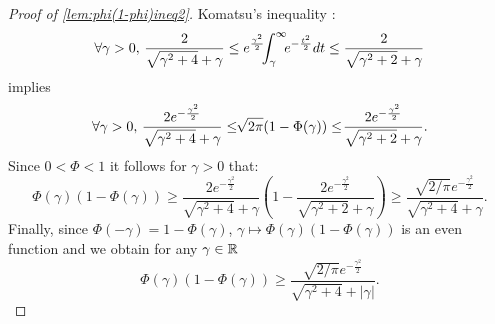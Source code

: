 \begin{proof}[Proof of \cref{lem:phi(1-phi)ineq2}]
    Komatsu's inequality \citep[p.~17]{ito_diffusion_1974}:
    \begin{equation}
        \forall \gamma>0,\, \frac{2}{\sqrt{\gamma^2+4}+\gamma}\leq e^{\frac{\gamma^2}{2}}\hspace*{-4pt}\int_\gamma^\infty\hspace*{-4pt} e^{-\frac{t^2}{2}}dt\leq \frac{2}{\sqrt{\gamma^2+2}+\gamma}
    \end{equation}
    implies
    \begin{equation}
        \forall \gamma>0,\, \frac{2e^{-\frac{\gamma^2}{2}}}{\sqrt{\gamma^2+4}+\gamma}\leq\hspace*{-3.5pt} \sqrt{2\pi}(1-\Phi(\gamma)) \leq\hspace*{-2pt} \frac{2e^{-\frac{\gamma^2}{2}}}{\sqrt{\gamma^2+2}+\gamma} .
    \end{equation}
    Since $0<\Phi<1$ it follows for $\gamma>0$ that:
    \begin{equation}
        \Phi(\gamma)(1-\Phi(\gamma)) \geq \frac{2e^{-\frac{\gamma^2}{2}}}{\sqrt{\gamma^2+4}+\gamma}\left(1-\frac{2e^{-\frac{\gamma^2}{2}}}{\sqrt{\gamma^2+2}+\gamma}\right)
            \geq \frac{\sqrt{2/\pi}e^{-\frac{\gamma^2}{2}}}{\sqrt{\gamma^2+4}+\gamma}.
    \end{equation}
    Finally, since $\Phi(-\gamma)=1-\Phi(\gamma)$, $\gamma\mapsto\Phi(\gamma)(1-\Phi(\gamma))$ is an even function and we obtain for any $\gamma\in\mathbb{R}$
    \begin{equation}
        \Phi(\gamma)(1-\Phi(\gamma))\geq \frac{\sqrt{2/\pi}e^{-\frac{\gamma^2}{2}}}{\sqrt{\gamma^2+4}+|\gamma|}.
    \end{equation}
\end{proof}






